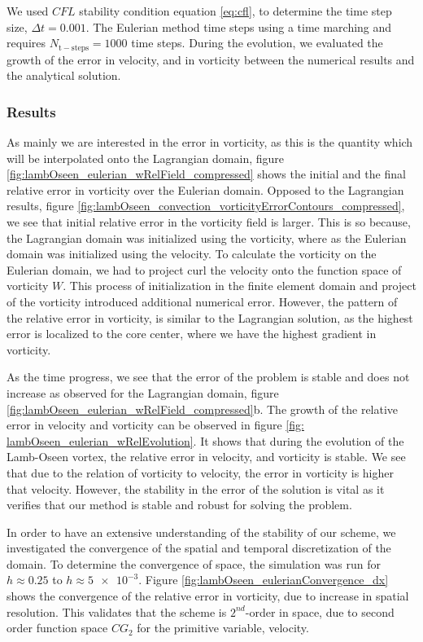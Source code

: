 We used $CFL$ stability condition equation \ref{eq:cfl}, to determine the time step size, $\Delta t = 0.001$. The Eulerian method time steps using a  time marching and requires $N_{\mathrm{t-steps}}=1000$ time steps. During the evolution, we evaluated the growth of the error in velocity, and in vorticity between the numerical results and the analytical solution. 

\subsubsection*{Results}
As mainly we are interested in the error in vorticity, as this is the quantity which will be interpolated onto the Lagrangian domain, figure \ref{fig:lambOseen_eulerian_wRelField_compressed} shows the initial and the final relative error in vorticity over the Eulerian domain. Opposed to the Lagrangian results, figure \ref{fig:lambOseen_convection_vorticityErrorContours_compressed}, we see that initial relative error in the vorticity field is larger. This is so because, the Lagrangian domain was initialized using the vorticity, where as the Eulerian domain was initialized using the velocity. To calculate the vorticity on the Eulerian domain, we had to project curl the velocity onto the function space of vorticity $W$. This process of initialization in the finite element domain and project of the vorticity introduced additional numerical error. However, the pattern of the relative error in vorticity, is similar to the Lagrangian solution, as the highest error is localized to the core center, where we have the highest gradient in vorticity.




As the time progress, we see that the error of the problem is stable and does not increase as observed for the Lagrangian domain, figure \ref{fig:lambOseen_eulerian_wRelField_compressed}b. The growth of the relative error in velocity and vorticity can be observed in figure \ref{fig: lambOseen_eulerian_wRelEvolution}. It shows that during the evolution of the Lamb-Oseen vortex, the relative error in velocity, and vorticity is stable. We see that due to the relation of vorticity to velocity, the error in vorticity is higher that velocity. However, the stability in the error of the solution is vital as it verifies that our method is stable and robust for solving the problem.

In order to have an extensive understanding of the stability of our scheme, we investigated the convergence of the spatial and temporal discretization of the domain. To determine the convergence of space, the simulation was run for $h \approx 0.25$ to $h \approx \num{5e-3}$. Figure \ref{fig:lambOseen_eulerianConvergence_dx} shows the convergence of the relative error in vorticity, due to increase in spatial resolution. This validates that the scheme is $2^{nd}$-order in space, due to second order function space $CG_2$ for the primitive variable, velocity.

